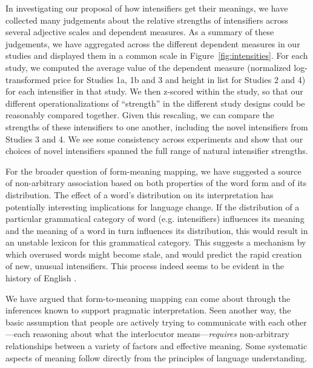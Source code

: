 In investigating our proposal of how intensifiers get their meanings, we have collected many judgements about the relative strengths of intensifiers across several adjective scales and dependent measures.
As a summary of these judgements, we have aggregated across the different dependent measures in our studies and displayed them in a common scale in Figure~\ref{fig:intensities}.
For each study, we computed the average value of the dependent measure (normalized log-transformed price for Studies 1a, 1b and 3 and height in list for Studies 2 and 4) for each intensifier in that study. We then z-scored within the study, so that our different operationalizations of ``strength'' in the different study designs could be reasonably compared together.
Given this rescaling, we can compare the strengths of these intensifiers to one another, including the novel intensifiers from Studies 3 and 4.
We see some consistency across experiments and show that our choices of novel intensifiers spanned the full range of natural intensifier strengths.

For the broader question of form-meaning mapping, we have suggested a source of non-arbitrary association based on both properties of the word form and of its distribution.
The effect of a word's distribution on its interpretation has potentially interesting implications for language change.
If the distribution of a particular grammatical category of word (e.g. intensifiers) influences its meaning and the meaning of a word in turn influences its distribution, this would result in an unstable lexicon for this grammatical category.
This suggests a mechanism by which overused words might become stale, and would predict the rapid creation of new, unusual intensifiers.
This process indeed seems to be evident in the history of English \cite{bolinger_degree_1972}.

We have argued that form-to-meaning mapping can come about through the inferences known to support pragmatic interpretation.
Seen another way, the basic assumption that people are actively trying to communicate with each other---each reasoning about what the interlocutor means---\emph{requires} non-arbitrary relationships between a variety of factors and effective meaning.
Some systematic aspects of meaning follow directly from the principles of language understanding.
